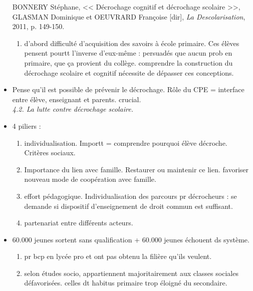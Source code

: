 \documentclass[12pt]{article}
\begin{document}
\begin{itemize}
{\begin{minipage}{19cm}
BONNERY Stéphane, << Décrochage cognitif et décrochage scolaire >>, GLASMAN Dominique et OEUVRARD Françoise [dir], \textit{La Descolarisation}, 2011, p. 149-150. \\

\begin{enumerate}
\item d'abord difficulté d'acquisition des savoirs à école primaire. Ces élèves pensent pourtt l'inverse d'eux-même : persuadés que aucun prob en primaire, que ça provient du collège. comprendre la construction du décrochage scolaire et cognitif nécessite de dépasser ces conceptions.
\end{enumerate}
\end{minipage}
}

\vspace{0.5cm}

\item Pense qu'il est possible de prévenir le décrochage. Rôle du CPE =  interface entre élève, enseignant et parents. crucial. \\

\textit{4.2. La lutte contre décrochage scolaire.}

\item 4 piliers : 
\begin{enumerate}
\item individualisation. Importt = comprendre pourquoi élève décroche. Critères sociaux. \\ 
\item Importance du lien avec famille. Restaurer ou maintenir ce lien. favoriser nouveau mode de coopération avec famille. \\
\item effort pédagogique. Individualisation des parcours pr décrocheurs : se demande si dispositif d'enseignement de droit commun est suffisant. \\
\item partenariat entre différents acteurs.
 
\end{enumerate}


\item 60.000 jeunes sortent sans qualification + 60.000 jeunes échouent ds système. \\
\begin{enumerate}
\item pr bcp en lycée pro et ont pas obtenu la filière qu'ils veulent. \\
\item selon études socio, appartiennent majoritairement aux classes sociales défavorisées. celles dt habitus primaire trop éloigné du secondaire.\\
\end{enumerate}


\end{itemize}
\end{document}
